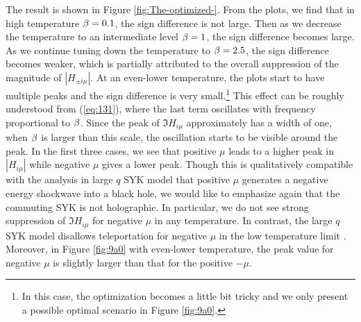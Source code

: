 \documentclass[11pt]{article}
\renewcommand{\>}{\rangle}
\newcommand{\<}{\langle}
\begin{document}
The result is shown in Figure \ref{fig:The-optimized-}. From the
plots, we find that in high temperature $\beta=0.1$, the sign difference
is not large. Then as we decrease the temperature to an intermediate
level $\beta=1$, the sign difference becomes large. As we continue tuning
down the temperature to $\beta=2.5$, the sign difference becomes weaker,
which is partially attributed to the overall suppression of the magnitude
of $|H_{\pm i\mu}|$. At an even-lower temperature, the plots start
to have multiple peaks and the sign difference is very small.\footnote{In this case, the optimization becomes a little bit tricky and we
only present a possible optimal scenario in Figure \ref{fig:9a0}. } This effect can be roughly understood from (\ref{eq:131}), where
the last term oscillates with frequency proportional to $\beta$. Since
the peak of $\Im H_{i\mu}$ approximately has a width of one, when
$\beta$ is larger than this scale, the oscillation starts to be visible
around the peak. In the first three cases, we see that positive $\mu$
leads to a higher peak in $|H_{i\mu}|$ while negative $\mu$ gives
a lower peak. Though this is qualitatively compatible with the analysis
in large $q$ SYK model \cite{Gao:2019nyj} that positive $\mu$ generates a negative
energy shockwave into a black hole, we would like to emphasize again
that the commuting SYK is not holographic. In particular, we do not
see strong suppression of $\Im H_{i\mu}$ for negative $\mu$ in
any temperature. In contrast, the large $q$ SYK model disallows teleportation
for negative $\mu$ in the low temperature limit \cite{Gao:2019nyj}. Moreover,
in Figure \ref{fig:9a0} with even-lower temperature, the peak value
for negative $\mu$ is slightly larger than that for the positive
$-\mu$.
\end{document}
